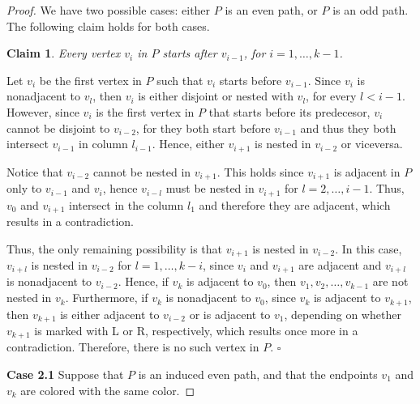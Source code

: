 \documentclass[a4paper,10pt]{report}
\theoremstyle{plain}
\newtheorem{claim}{Claim}[section]
\theoremstyle{remark}
\theoremstyle{plain}
\newcommand*{\QED}{\hfill\ensuremath{\square}}%
\begin{document}
{\begin{proof}

	We have two possible cases: either $P$ is an even path, or $P$ is an odd path. The following claim holds for both cases.
	
	\begin{claim}
		Every vertex $v_i$ in $P$ starts after $v_{i-1}$, for $i = 1, \ldots, k-1$.
	\end{claim}
	
	Let $v_i$ be the first vertex in $P$ such that $v_i$ starts before $v_{i-1}$.
	Since $v_i$ is nonadjacent to $v_l$, then $v_i$ is either disjoint or nested with $v_l$, for every $l < i-1$. However, since $v_i$ is the first vertex in $P$ that starts before its predecesor, $v_i$ cannot be disjoint to $v_{i-2}$, for they both start before $v_{i-1}$ and thus they both intersect $v_{i-1}$ in column $l_{i-1}$. Hence, either $v_{i+1}$ is nested in $v_{i-2}$ or viceversa.
	
	Notice that $v_{i-2}$ cannot be nested in $v_{i+1}$. This holds since $v_{i+1}$ is adjacent in $P$ only to $v_{i-1}$ and $v_i$, hence $v_{i-l}$ must be nested in $v_{i+1}$ for $l = 2, \ldots, i-1$. Thus, $v_0$ and $v_{i+1}$ intersect in the column $l_1$ and therefore they are adjacent, which results in a contradiction. 
		
	Thus, the only remaining possibility is that $v_{i+1}$ is nested in $v_{i-2}$. In this case, $v_{i+l}$ is nested in $v_{i-2}$ for $l = 1, \ldots, k-i$, since $v_i$ and $v_{i+1}$ are adjacent and $v_{i+l}$ is nonadjacent to $v_{i-2}$. 
	Hence, if $v_k$ is adjacent to $v_0$, then $v_1, v_2, \ldots, v_{k-1}$ are not nested in $v_k$. Furthermore, if $v_k$ is nonadjacent to $v_0$, since $v_k$ is adjacent to $v_{k+1}$, then $v_{k+1}$ is either adjacent to $v_{i-2}$ or is adjacent to $v_1$, depending on whether $v_{k+1}$ is marked with L or R, respectively, which results once more in a contradiction. 	
	Therefore, there is no such vertex in $P$. \QED
	
	\vspace{3mm}
	
 	\textbf{Case 2.1} Suppose that $P$ is an induced even path, and that the endpoints $v_1$ and $v_k$ are colored with the same color. 
		

\end{proof}}
\end{document}

